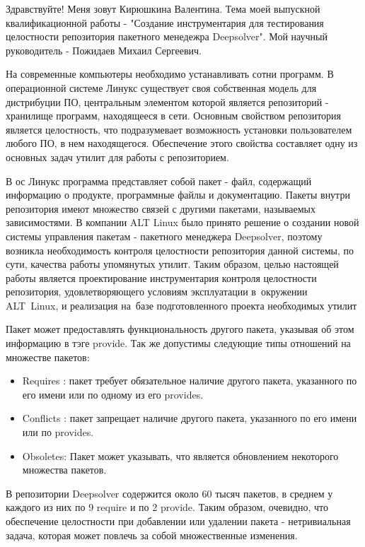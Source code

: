 \documentclass[a4paper]{article}
\begin{document}
\huge

Здравствуйте!
Меня зовут Кирюшкина Валентина. Тема моей выпускной квалификационной
работы - "Создание инструментария для тестирования целостности репозитория 
пакетного менедежра Deepsolver". Мой научный руководитель - Пожидаев
Михаил Сергеевич.

\newpage
На современные компьютеры необходимо устанавливать сотни программ.
В операционной системе Линукс существует своя собственная модель 
для дистрибуции ПО, центральным элементом которой является репозиторий 
- хранилище программ, находящееся в сети. Основным свойством репозитория
является целостность, что подразумевает возможность установки 
пользователем любого ПО, в нем находящегося. Обеспечение этого 
свойства составляет одну из основных задач утилит для работы с 
репозиторием. 

В ос Линукс программа представляет собой пакет - файл, содержащий 
информацию о продукте, программные файлы и документацию. 
Пакеты внутри репозитория имеют множество связей с другими пакетами, 
называемых зависимостями. 
\newpage
В компании  ALT Linux было принято решение о создании новой системы
управления пакетам  - пакетного менеджера Deepsolver, поэтому возникла 
необходимость контроля целостности репозитория данной системы, по сути, 
качества работы упомянутых утилит. %
\newpage
Таким образом, целью настоящей работы является проектирование 
инструментария контроля целостности репозитория, удовлетворяющего условиям эксплуатации в~окружении ALT~Linux, 
и реализация на~базе подготовленного проекта необходимых утилит
\newpage



 Пакет может предоставлять функциональность другого пакета, указывая об 
этом информацию в тэге provide. 
Так же допустимы следующие типы отношений на множестве пакетов:
\begin{itemize}
\item
Requires : пакет требует обязательное наличие другого пакета, указанного 
по его имени или по одному из его provides.
\item
Conflicts :
пакет запрещает наличие другого пакета, указанного по его имени или по
provides.
\item 
Obsoletes: Пакет может указывать, что является обновлением некоторого 
множества пакетов. 
\end{itemize}

\newpage

В репозитории Deepsolver содержится около 60 тысяч пакетов, в среднем у каждого 
из них по 9 require и по 2 provide.
Таким образом, очевидно, что обеспечение целостности при добавлении или удалении пакета - 
нетривиальная задача, которая может повлечь за собой множественные изменения.
\end{document}

